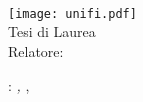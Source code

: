 \begin{titlepage}
	\begin{center}
		\large
		\hfill
		\vfill
		\begingroup
			\spacedallcaps{\myUni}\\
			\myFaculty \\
			\myDegree \\ 
			\vspace{0.5cm}
			\texttt{[image: unifi.pdf]}\\
			\vspace{0.5cm}
			Tesi di Laurea
		\endgroup
		\vfill
		\begingroup
			\color{Maroon}\spacedallcaps{\myTitle}\\
			\bigskip
		\endgroup
		\spacedlowsmallcaps{\myName}
		\vfill
		Relatore: \itshape{\myProf}
		\vfill
		\myTime
		\vfill
	\end{center}
\end{titlepage}
\newpage
	\thispagestyle{empty}
	\hfill
	\vfill
	\noindent\myName: \textit{\myTitle,} \myDegree, \textcopyright\ \myTime
